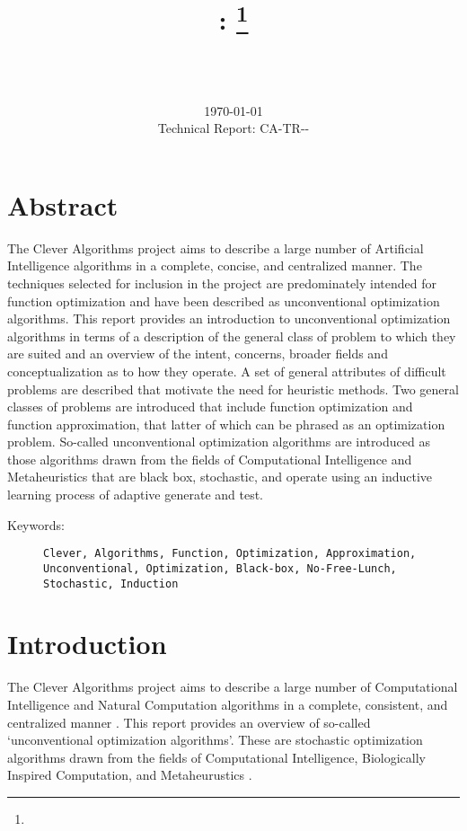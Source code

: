 \documentclass[a4paper, 11pt]{article}
\title{{\myreporttitle}: {\myreportsubtitle}\footnote{\myreportlicense}}
\author{\myreportauthor\\{\myreportemail}\\\small\myreportproject}
\date{\today\\{\small{Technical Report: CA-TR-{\myreportdate}-\myreportversion}}}
\begin{document}
\maketitle

\section*{Abstract} 
The Clever Algorithms project aims to describe a large number of Artificial Intelligence algorithms in a complete, concise, and centralized manner.
The techniques selected for inclusion in the project are predominately intended for function optimization and have been described as unconventional optimization algorithms. 
This report provides an introduction to unconventional optimization algorithms in terms of a description of the general class of problem to which they are suited and an overview of the intent, concerns, broader fields and conceptualization as to how they operate.
A set of general attributes of difficult problems are described that motivate the need for heuristic methods. Two general classes of problems are introduced that include function optimization and function approximation, that latter of which can be phrased as an optimization problem.
So-called unconventional optimization algorithms are introduced as those algorithms drawn from the fields of Computational Intelligence and Metaheuristics that are black box, stochastic, and operate using an inductive learning process of adaptive generate and test.

\begin{description}
	\item[Keywords:] {\small\texttt{Clever, Algorithms, Function, Optimization, Approximation, \\ 
	Unconventional, Optimization, Black-box, No-Free-Lunch, Stochastic, Induction}}
\end{description} 

\section{Introduction}
\label{sec:introduction}
The Clever Algorithms project aims to describe a large number of Computational Intelligence and Natural Computation algorithms in a complete, consistent, and centralized manner \cite{Brownlee2010}.
This report provides an overview of so-called `unconventional optimization algorithms'. These are stochastic optimization algorithms drawn from the fields of Computational Intelligence, Biologically Inspired Computation, and Metaheurustics \cite{Brownlee2010c}.
\end{document}
